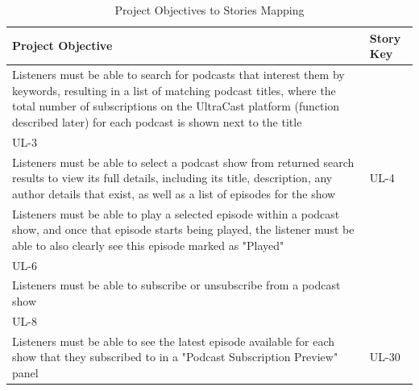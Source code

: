 \documentclass[12pt]{article}
\begin{document}
\begin{table}
    \centering
    \caption{Project Objectives to Stories Mapping}
    \label{table:project_objectives_to_stories}
    \bigskip
    \begin{tabularx}{\linewidth}{|>{\hsize=1.8\hsize}X|>{\hsize=0.2\hsize}X|}
        \hline
        \textbf{Project Objective}                                                                                                                                                                                                                                             & \textbf{Story Key}             \\
        \hline
        Listeners must be able to search for podcasts that interest them by keywords, resulting in a list of matching podcast titles, where the total number of subscriptions on the UltraCast platform (function described later) for each podcast is shown next to the title & \begin{tabular}[c]{@{}l@{}}UL-2\\ UL-3\end{tabular}  \\ \hline
        Listeners must be able to select a podcast show from returned search results to view its full details, including its title, description, any author details that exist, as well as a list of episodes for the show                                                     & UL-4                           \\ \hline
        Listeners must be able to play a selected episode within a podcast show, and once that episode starts being played, the listener must be able to also clearly see this episode marked as "Played"                                                                      & \begin{tabular}[c]{@{}l@{}}UL-5\\ UL-6\end{tabular}  \\ \hline
        Listeners must be able to subscribe or unsubscribe from a podcast show                                                                                                                                                                                                 & \begin{tabular}[c]{@{}l@{}}UL-7\\ UL-8\end{tabular}  \\ \hline
        Listeners must be able to see the latest episode available for each show that they subscribed to in a "Podcast Subscription Preview" panel                                                                                                                             & UL-30                          \\ \hline

\end{tabularx}
\end{table}
\end{document}
